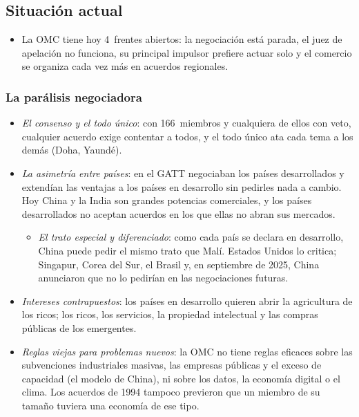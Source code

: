\documentclass[11pt]{article}
\begin{document}
\subsection{Situación actual}\label{sec:situacion}

\begin{itemize}
\item La OMC tiene hoy 4~frentes abiertos: la negociación está parada, el juez de apelación no funciona, su principal impulsor prefiere actuar solo y el comercio se organiza cada vez más en acuerdos regionales.
\end{itemize}

\subsubsection{La parálisis negociadora}\label{sec:paralisis}

\begin{itemize}
\item \emph{El consenso y el todo único}: con 166~miembros y cualquiera de ellos con veto, cualquier acuerdo exige contentar a todos, y el todo único ata cada tema a los demás (Doha, Yaundé).
\item \emph{La asimetría entre países}: en el GATT negociaban los países desarrollados y extendían las ventajas a los países en desarrollo sin pedirles nada a cambio. Hoy China y la India son grandes potencias comerciales, y los países desarrollados no aceptan acuerdos en los que ellas no abran sus mercados.
  \begin{itemize}
  \item \emph{El trato especial y diferenciado}: como cada país se declara en desarrollo, China puede pedir el mismo trato que Malí. Estados Unidos lo critica; Singapur, Corea del Sur, el Brasil y, en septiembre de 2025, China anunciaron que no lo pedirían en las negociaciones futuras\nocite{OMC2025ChinaTED}.
  \end{itemize}
\item \emph{Intereses contrapuestos}: los países en desarrollo quieren abrir la agricultura de los ricos; los ricos, los servicios, la propiedad intelectual y las compras públicas de los emergentes.
\item \emph{Reglas viejas para problemas nuevos}: la OMC no tiene reglas eficaces sobre las subvenciones industriales masivas, las empresas públicas y el exceso de capacidad (el modelo de China), ni sobre los datos, la economía digital o el clima. Los acuerdos de 1994 tampoco previeron que un miembro de su tamaño tuviera una economía de ese tipo.
\end{itemize}
\end{document}
